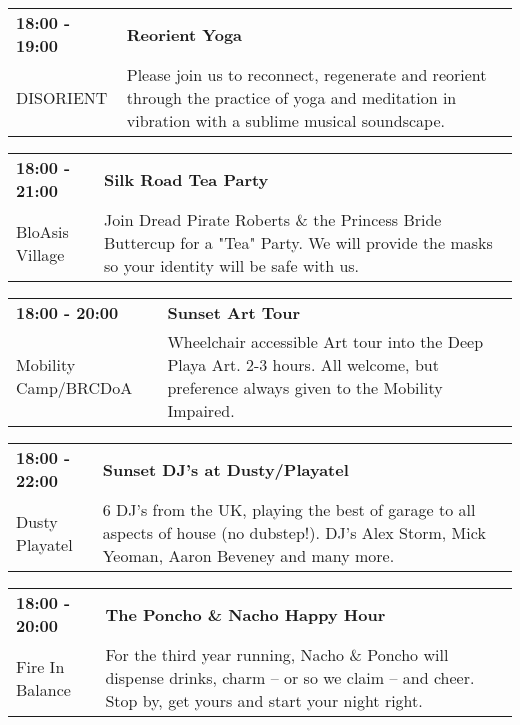 \begin{tabular}{ p{1in} p{2.2in} }
    \textbf{18:00 - 19:00} & \textbf{Reorient Yoga} \\
    DISORIENT \newline  & Please join us to reconnect, regenerate and reorient through the practice of yoga and meditation in vibration with a sublime musical soundscape. \\
    \hline 
\end{tabular}
    
\begin{tabular}{ p{1in} p{2.2in} }
    \textbf{18:00 - 21:00} & \textbf{Silk Road Tea Party} \\
    BloAsis Village \newline  & Join Dread Pirate Roberts \& the Princess Bride Buttercup for a "Tea" Party. We will provide the masks so your identity will be safe with us. \\
    \hline 
\end{tabular}
    
\begin{tabular}{ p{1in} p{2.2in} }
    \textbf{18:00 - 20:00} & \textbf{Sunset Art Tour} \\
    Mobility Camp/BRCDoA \newline  & Wheelchair accessible Art tour into the Deep Playa Art.
2-3 hours. All welcome, but preference always given to the Mobility Impaired. \\
    \hline 
\end{tabular}
    
\begin{tabular}{ p{1in} p{2.2in} }
    \textbf{18:00 - 22:00} & \textbf{Sunset DJ's at Dusty/Playatel} \\
    Dusty Playatel \newline  & 6 DJ's from the UK, playing the best of garage to all aspects of house (no dubstep!). DJ's Alex Storm, Mick Yeoman, Aaron Beveney and many more. \\
    \hline 
\end{tabular}
    
\begin{tabular}{ p{1in} p{2.2in} }
    \textbf{18:00 - 20:00} & \textbf{The Poncho \& Nacho Happy Hour} \\
    Fire In Balance \newline  & For the third year running, Nacho \& Poncho will dispense drinks, charm -- or so we claim -- and cheer. Stop by, get yours and start your night right. \\
    \hline 
\end{tabular}
    
